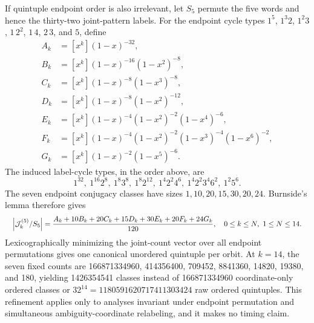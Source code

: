 \documentclass{article}
\newcommand{\fitmath}[1]{\resizebox{0.99\linewidth}{!}{$\displaystyle #1$}}
\begin{document}
If quintuple endpoint order is also irrelevant, let $S_5$ permute the five
words and hence the thirty-two joint-pattern labels. For the endpoint cycle
types $1^5$, $1^3 2$, $1^2 3$, $1\,2^2$, $1\,4$, $2\,3$, and $5$, define
\[
  \begin{aligned}
    A_k&=[x^k](1-x)^{-32},\\
    B_k&=[x^k](1-x)^{-16}(1-x^2)^{-8},\\
    C_k&=[x^k](1-x)^{-8}(1-x^3)^{-8},\\
    D_k&=[x^k](1-x)^{-8}(1-x^2)^{-12},\\
    E_k&=[x^k](1-x)^{-4}(1-x^2)^{-2}(1-x^4)^{-6},\\
    F_k&=[x^k](1-x)^{-4}(1-x^2)^{-2}(1-x^3)^{-4}(1-x^6)^{-2},\\
    G_k&=[x^k](1-x)^{-2}(1-x^5)^{-6}.
  \end{aligned}
\]
The induced label-cycle types, in the order above, are
\[
  1^{32},\ 1^{16}2^8,\ 1^8 3^8,\ 1^8 2^{12},\
  1^4 2^2 4^6,\ 1^4 2^2 3^4 6^2,\ 1^2 5^6.
\]
The seven endpoint conjugacy classes have sizes $1,10,20,15,30,20,24$.
Burnside's lemma therefore gives
\begin{equation}
  \fitmath{%
    \left|\mathcal{J}^{(5)}_k/S_5\right|
      =\frac{A_k+10B_k+20C_k+15D_k+30E_k+20F_k+24G_k}{120},
    \quad 0\leq k\leq N,\ 1\leq N\leq14.
  }
  \label{eq:optimization-crazy-preimage-cube-unordered-quintuple-quotient}
\end{equation}
Lexicographically minimizing the joint-count vector over all endpoint
permutations gives one canonical unordered quintuple per orbit. At $k=14$, the
seven fixed counts are 166871334960, 414356400, 709452, 8841360, 14820, 19380,
and 180, yielding 1426354541 classes instead of 166871334960 coordinate-only
ordered classes or $32^{14}=1180591620717411303424$ raw ordered quintuples.
This refinement applies only to analyses invariant under endpoint permutation
and simultaneous ambiguity-coordinate relabeling, and it makes no timing claim.
\end{document}
